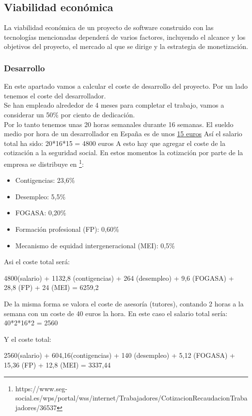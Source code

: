 \subsection{Viabilidad económica}
La viabilidad económica de un proyecto de software construido con las tecnologías 
mencionadas dependerá de varios factores, incluyendo el alcance y los objetivos del proyecto, 
el mercado al que se dirige y la estrategia de monetización.

\subsubsection{Desarrollo}
En este apartado vamos a calcular el coste de desarrollo del proyecto.
Por un lado tenemos el coste del desarrollador.\\
Se han empleado alrededor de 4 meses para completar el trabajo, vamos a considerar 
un 50\% por ciento de dedicación.\\
Por lo tanto tenemos unas 20 horas semanales durante 16 semanas.
El sueldo medio por hora de un desarrollador en España es de unos \href{https://es.talent.com}{15 euros} 
Así el salario total ha sido: 20*16*15 = 4800 euros
A esto hay que agregar el coste de la cotización a la seguridad social.
En estos momentos la cotización por parte de la empresa se distribuye en 
\footnote{https://www.seg-social.es/wps/portal/wss/internet/Trabajadores/CotizacionRecaudacionTrabajadores/36537}:
\begin{itemize}
    \item Contigencias: 23,6\%
    \item Desempleo: 5,5\%
    \item FOGASA: 0,20\%
    \item Formación profesional (FP): 0,60\%
    \item Mecanismo de equidad intergeneracional (MEI): 0,5\%
\end{itemize}
Asi el coste total será:

4800(salario) + 1132,8 (contigencias) + 264 (desempleo) + 9,6 (FOGASA) + 28,8 (FP) + 24 (MEI) = 6259,2

De la misma forma se valora el coste de asesoría (tutores), contando 2 horas a la
 semana con un coste de 40 euros la hora. 
En este caso el salario total sería:
40*2*16*2 = 2560

Y el coste total: 

2560(salario) + 604,16(contigencias) +  140 (desempleo) + 5,12 (FOGASA) + 15,36 (FP) + 12,8 (MEI) = 3337,44

